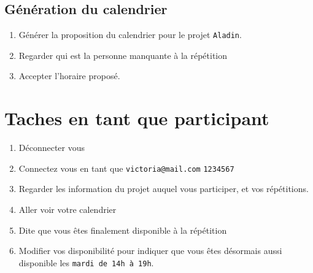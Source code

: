\documentclass[11pt]{article}
\begin{document}
\subsection{Génération du calendrier}
\begin{enumerate}
    \item Générer la proposition du calendrier pour le projet \texttt{Aladin}.
    \item Regarder qui est la personne manquante à la répétition \texttt{} %
    \item Accepter l'horaire proposé.
\end{enumerate}

\section{Taches en tant que participant}
\begin{enumerate}
    \item Déconnecter vous
    \item Connectez vous en tant que \texttt{victoria@mail.com} \texttt{1234567}
    \item Regarder les information du projet auquel vous participer, et vos répétitions.
    \item Aller voir votre calendrier
    \item Dite que vous êtes finalement disponible à la répétition \texttt{} %
    \item Modifier vos disponibilité pour indiquer que vous êtes désormais aussi disponible les \texttt{mardi de 14h à 19h}.
\end{enumerate}
\end{document}
